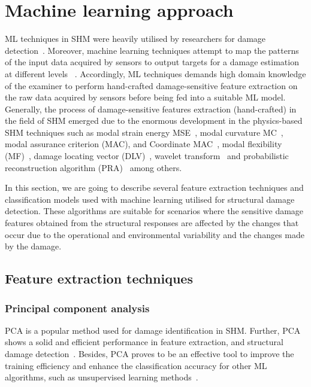\section{Machine learning approach}
ML techniques in SHM were heavily utilised by researchers for damage detection~\cite{Doebling1998, alvandi2006assessment, fan2011vibration, raghavan2008effects, su2009identification, Mitra2016}.
Moreover, machine learning techniques attempt to map the patterns of the input data acquired by sensors to output targets for a damage estimation at different levels ~\cite{rytter1993vibrational}.
Accordingly, ML techniques demands high domain knowledge of the examiner to perform hand-crafted damage-sensitive feature extraction on the raw data acquired by sensors before being fed into a suitable ML model.
Generally, the process of damage-sensitive features extraction (hand-crafted) in the field of SHM emerged due to the enormous development in the physics-based SHM techniques such as modal strain energy MSE~\cite{Kim}, modal curvature MC~\cite{Wahab}, modal assurance criterion (MAC), and Coordinate MAC~\cite{Allemang2003}, modal flexibility (MF)~\cite{Jaishi}, damage locating vector (DLV)~\cite{Bernal2002}, wavelet transform~\cite{Staszewski,Kima} and probabilistic reconstruction algorithm (PRA)~\cite{Hay2006} among others.

In this section, we are going to describe several feature extraction techniques and classification models used with machine learning utilised for structural damage detection.
These algorithms are suitable for scenarios where the sensitive damage features obtained from the structural responses are affected by the changes that occur due to the operational and environmental variability and the changes made by the damage.
\subsection{Feature extraction techniques}
\subsubsection{Principal component analysis}
PCA is a popular method used for damage identification in SHM.
Further, PCA shows a solid and efficient performance in feature extraction, and structural damage detection~\cite{liu2014research, wang2014principal, nguyen2010fault}. 
Besides, PCA proves to be an effective tool to improve the training efficiency and enhance the classification accuracy for other ML algorithms, such as unsupervised learning methods~\cite{liu2019rapid, datteo2017statistical, torres2014data}. 

